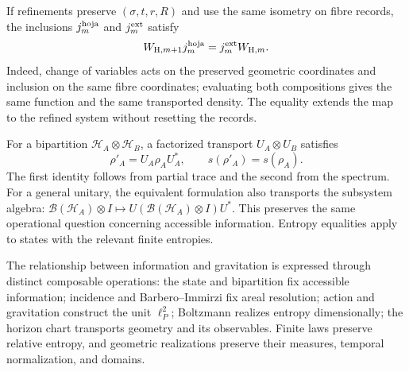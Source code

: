 If refinements preserve \((\sigma,t,r,R)\) and use the same
isometry on fibre records, the inclusions
\(j_m^{\rm hoja}\) and \(j_m^{\rm ext}\) satisfy
\begin{equation}
 W_{{\rm H},m+1}j_m^{\rm hoja}
 =j_m^{\rm ext}W_{{\rm H},m}.
 \label{vii:eq:naturalidad-horizonte}
\end{equation}
Indeed, change of variables acts on the preserved geometric coordinates
and inclusion on the same fibre coordinates; evaluating
both compositions gives the same function and the same transported density.
The equality extends the map to the refined system without resetting the records.

For a bipartition \(\mathcal H_A\otimes\mathcal H_B\), a
factorized transport \(U_A\otimes U_B\) satisfies
\[
 \rho'_A=U_A\rho_AU_A^*,\qquad s(\rho'_A)=s(\rho_A).
\]
The first identity follows from partial trace and the second from the spectrum.
For a general unitary, the equivalent formulation also transports
the subsystem algebra:
\(\mathcal B(\mathcal H_A)\otimes I\mapsto
U(\mathcal B(\mathcal H_A)\otimes I)U^*\).
This preserves the same operational question concerning accessible
information. Entropy equalities apply to states with the relevant
finite entropies.

The relationship between information and gravitation is expressed through
distinct composable operations: the state and bipartition fix
accessible information; incidence and Barbero--Immirzi fix areal
resolution; action and gravitation construct the unit \(\ell_P^2\);
Boltzmann realizes entropy dimensionally; the horizon chart
transports geometry and its observables. Finite laws preserve
relative entropy, and geometric realizations preserve their measures,
temporal normalization, and domains.
